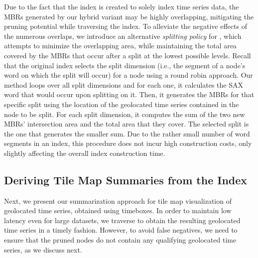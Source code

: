 Due to the fact that the \isax index is created to solely index time series data, the MBRs generated by our hybrid variant may be highly overlapping, mitigating the pruning potential while traversing the index. To alleviate the negative effects of the numerous overlaps, we introduce an alternative {\em splitting policy} for \hisax, which attempts to minimize the overlapping area, while maintaining the total area covered by the MBRs that occur after a split at the lowest possible levels. Recall that the original \isax index selects the split dimension (i.e., the segment of a node's word on which the split will occur) for a node using a round robin approach. Our method loops over all split dimensions and for each one, it calculates the SAX word that would occur upon splitting on it. Then, it generates the MBRs for that specific split using the location of the geolocated time series contained in the node to be split. For each split dimension, it computes the sum of the two new MBRs' intersection area and the total area that they cover. The selected split is the one that generates the smaller sum. Due to the rather small number of word segments in an \isax index, this procedure does not incur high construction costs, only slightly affecting the overall index construction time.

\subsection{Deriving Tile Map Summaries from the \hisax Index}
\label{subsec:tilemapvis}

Next, we present our summarization approach for tile map visualization of geolocated time series, obtained using timeboxes. In order to maintain low latency even for large datasets, we traverse \hisax to obtain the resulting geolocated time series in a timely fashion. However, to avoid false negatives, we need to ensure that the pruned nodes do not contain any qualifying geolocated time series, as we discuss next. 

